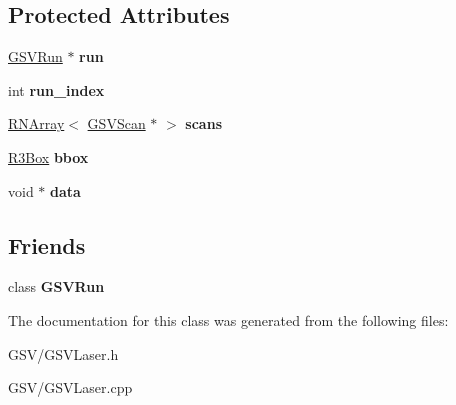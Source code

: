 \subsection*{Protected Attributes}
\begin{DoxyCompactItemize}
\item 
\hyperlink{class_g_s_v_run}{G\+S\+V\+Run} $\ast$ {\bfseries run}\hypertarget{class_g_s_v_laser_ac1c7c90dabfcbbf17643220beeec9078}{}\label{class_g_s_v_laser_ac1c7c90dabfcbbf17643220beeec9078}

\item 
int {\bfseries run\+\_\+index}\hypertarget{class_g_s_v_laser_ac978493003fd61915ad20b3054cea434}{}\label{class_g_s_v_laser_ac978493003fd61915ad20b3054cea434}

\item 
\hyperlink{class_r_n_array}{R\+N\+Array}$<$ \hyperlink{class_g_s_v_scan}{G\+S\+V\+Scan} $\ast$ $>$ {\bfseries scans}\hypertarget{class_g_s_v_laser_ae9475217258caac68eade097512e0aa7}{}\label{class_g_s_v_laser_ae9475217258caac68eade097512e0aa7}

\item 
\hyperlink{class_r3_box}{R3\+Box} {\bfseries bbox}\hypertarget{class_g_s_v_laser_ad9f581a176c074a6c21615bc5ec4a26a}{}\label{class_g_s_v_laser_ad9f581a176c074a6c21615bc5ec4a26a}

\item 
void $\ast$ {\bfseries data}\hypertarget{class_g_s_v_laser_a1c932c1673fb8e91961bffba6babd980}{}\label{class_g_s_v_laser_a1c932c1673fb8e91961bffba6babd980}

\end{DoxyCompactItemize}
\subsection*{Friends}
\begin{DoxyCompactItemize}
\item 
class {\bfseries G\+S\+V\+Run}\hypertarget{class_g_s_v_laser_ae54f10cc7f586c4696bcda2addbb27e0}{}\label{class_g_s_v_laser_ae54f10cc7f586c4696bcda2addbb27e0}

\end{DoxyCompactItemize}


The documentation for this class was generated from the following files\+:\begin{DoxyCompactItemize}
\item 
G\+S\+V/G\+S\+V\+Laser.\+h\item 
G\+S\+V/G\+S\+V\+Laser.\+cpp\end{DoxyCompactItemize}
